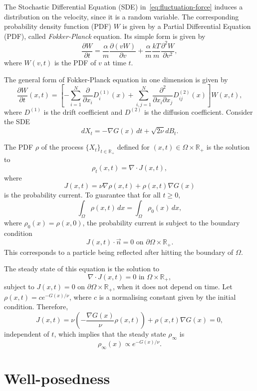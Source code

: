 \documentclass[12pt]{article}
\newcommand{\R}{\mathbb{R}}
\newcommand{\n}{\vec{n}}
\newcommand{\steady}{\rho_{\infty}}
\theoremstyle{definition}
\begin{document}
The Stochastic Differential Equation (SDE) in~\eqref{eq:fluctuation-force} induces a distribution on the velocity, since it is a random variable.
The corresponding probability density function (PDF) $W$ is given by a Partial Differential Equation (PDF), called {\em Fokker-Planck\/} equation.
Its simple form is given by
\[
\frac{\partial W}{\partial t} = \frac{\alpha}{m} \frac{\partial (v W)}{\partial v} + \frac{\alpha}{m} \frac{kT}{m} \frac{\partial^2 W}{\partial v^2},
\]
where $W(v,t)$ is the PDF of $v$ at time $t$.

The general form of Fokker-Planck equation in one dimension is given by 
\begin{equation}
    \label{eq:fokker-planck-1d}
    \frac{\partial W}{\partial t}(x,t) = \left[-\sum_{i=1}^N \frac{\partial}{\partial x_i} D_i^{(1)}(x) + \sum_{i,j=1}^N \frac{\partial^2}{\partial x_i \partial x_j} D_{ij}^{(2)}(x)\right]W(x,t),
\end{equation}
where $D^{(1)}$ is the drift coefficient and $D^{(2)}$ is the diffusion coefficient.
Consider the SDE
\[
dX_t = -\nabla G(x) \, dt + \sqrt{2\nu} dB_t.
\]

The PDF $\rho$ of the process ${\{X_t\}}_{t \in \R_+}$ defined for $(x,t) \in \Omega \times \R_+$ is the solution to 
\[
\rho_t(x,t) = \nabla \cdot J(x,t),
\]
where
\[
J(x,t) = \nu \nabla \rho(x,t) + \rho(x,t) \nabla G(x)
\]
is the probability current. 
To guarantee that for all $t \ge 0$, 
\[
\int_{\Omega} \rho(x,t) \, dx = \int_{\Omega} \rho_0(x) \, dx,
\]
where $\rho_0(x) = \rho(x,0)$, the probability current is subject to the boundary condition
\[
J(x,t) \cdot \n = 0 \text{ on } \partial \Omega \times \R_+.
\]
This corresponds to a particle being reflected after hitting the boundary of $\Omega$.


The steady state of this equation is the solution to
\[
\nabla \cdot J(x,t) = 0 \text{ in } \Omega \times \R_+,
\]
subject to $J(x,t) = 0 $ on $\partial \Omega \times \R_+$, when it does not depend on time.
Let $\rho(x,t) = c e^{-G(x)/\nu}$, where $c$ is a normalising constant given by the initial condition.
Therefore, 
\[
J(x,t) = \nu \left(-\frac{\nabla G(x)}{\nu} \rho(x,t)\right) + \rho(x,t) \nabla G(x) = 0,
\]
independent of $t$, which implies that the steady state $\steady$ is 
\[
\steady(x) \propto e^{-G(x)/\nu}.
\]

\section{Well-posedness}
\end{document}

